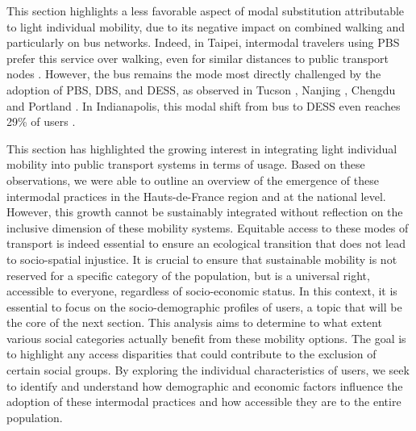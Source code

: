 \begin{refsegment}
This section highlights a less favorable aspect of modal substitution attributable to light individual mobility, due to its negative impact on combined walking and particularly on bus networks. Indeed, in Taipei, intermodal travelers using \acrshort{PBS} prefer this service over walking, even for similar distances to public transport nodes \textcolor{blue}{\autocite[8]{yen_how_2023}}. However, the bus remains the mode most directly challenged by the adoption of \acrshort{PBS}, \acrshort{DBS}, and \acrshort{DESS}, as observed in Tucson \textcolor{blue}{\autocite[16]{li_investigating_2022}}, Nanjing \textcolor{blue}{\autocite[12]{chen_what_2022}}, Chengdu \textcolor{blue}{\autocite[107]{ma_impacts_2019}} and Portland \textcolor{blue}{\autocite[411]{mcqueen_assessing_2022}}. In Indianapolis, this modal shift from bus to \acrshort{DESS} even reaches 29\% of users \textcolor{blue}{\autocite[10]{luo_are_2021}}.%

This section has highlighted the growing interest in integrating light individual mobility into public transport systems in terms of usage. Based on these observations, we were able to outline an overview of the emergence of these intermodal practices in the Hauts-de-France region and at the national level. However, this growth cannot be sustainably integrated without reflection on the inclusive dimension of these mobility systems. Equitable access to these modes of transport is indeed essential to ensure an ecological transition that does not lead to socio-spatial injustice. It is crucial to ensure that sustainable mobility is not reserved for a specific category of the population, but is a universal right, accessible to everyone, regardless of socio-economic status. In this context, it is essential to focus on the socio-demographic profiles of users, a topic that will be the core of the next section. This analysis aims to determine to what extent various social categories actually benefit from these mobility options. The goal is to highlight any access disparities that could contribute to the exclusion of certain social groups. By exploring the individual characteristics of users, we seek to identify and understand how demographic and economic factors influence the adoption of these intermodal practices and how accessible they are to the entire population.%


\end{refsegment}
